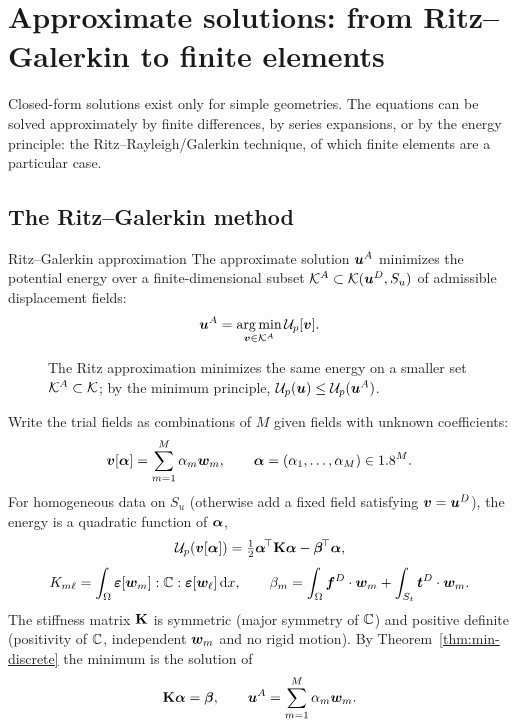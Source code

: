 \section{Approximate solutions: from Ritz--Galerkin to finite elements}\label{sec:el-ritz}
%
Closed-form solutions exist only for simple geometries. The equations can be
solved approximately by finite differences, by series expansions, or by the
energy principle: the Ritz--Rayleigh/Galerkin technique, of which finite
elements are a particular case.

\subsection{The Ritz--Galerkin method}
\begin{gbox}{Ritz--Galerkin approximation}
The approximate solution $\bm{u}^A$ minimizes the potential energy over a
finite-dimensional subset $\mathcal{K}^A\subset\mathcal{K}(\bm{u}^{D},S_u)$ of admissible
displacement fields:
\[
  \bm{u}^A=\operatorname*{arg\,min}_{\bm{v}\in\mathcal{K}^A}\mathcal U_p[\bm{v}].
\]
\end{gbox}
\begin{figure}[h]
\centering

\caption{The Ritz approximation minimizes the same energy on a smaller set
$\mathcal{K}^A\subset\mathcal{K}$; by the minimum principle,
$\mathcal U_p(\bm{u})\le\mathcal U_p(\bm{u}^A)$.}
\label{fig:ritz}
\end{figure}
Write the trial fields as combinations of $M$ given fields with unknown
coefficients:
\[
  \bm{v}[\bm{\alpha}]=\sum_{m=1}^M\alpha_m\bm{w}_m,\qquad
  \bm{\alpha}=(\alpha_1,\dots,\alpha_M)\in1.8^M .
\]
For homogeneous data on $S_u$ (otherwise add a fixed field satisfying
$\bm{v}=\bm{u}^{D}$), the energy is a quadratic function of $\bm{\alpha}$,
\[
  \mathcal U_p(\bm{v}[\bm{\alpha}])=\tfrac12\bm{\alpha}^{\!\top}\mathbf{K}\bm{\alpha}-\bm{\beta}^{\!\top}\bm{\alpha},
\]
\[
  K_{m\ell}=\int_\Omega\bm{\varepsilon}[\bm{w}_m]:\mathbb{C}:\bm{\varepsilon}[\bm{w}_\ell]\,\mathrm{d} x,\qquad
  \beta_m=\int_\Omega\bm{f}^{D}\cdot\bm{w}_m+\int_{S_t}\bm{t}^{D}\cdot\bm{w}_m .
\]
The stiffness matrix $\mathbf{K}$ is symmetric (major symmetry of $\mathbb{C}$) and
positive definite (positivity of $\mathbb{C}$, independent $\bm{w}_m$ and no rigid
motion). By Theorem~\ref{thm:min-discrete} the minimum is the solution of
\[
  \mathbf{K}\bm{\alpha}=\bm{\beta},\qquad
  \bm{u}^A=\sum_{m=1}^M\alpha_m\bm{w}_m .
\]


